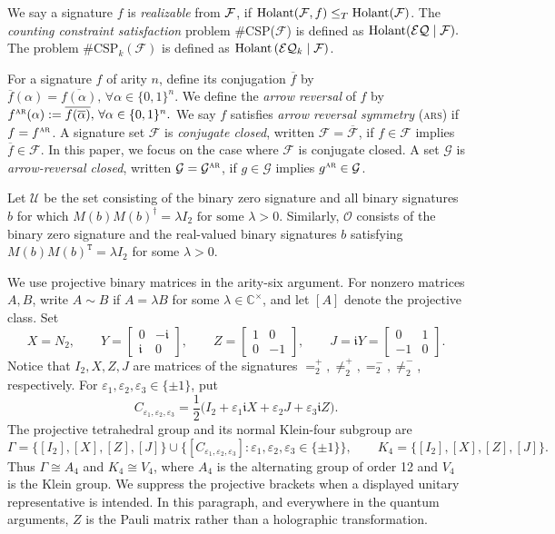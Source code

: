 We say a signature $f$ is \emph{realizable} from $\mathcal{F}$, if $\operatorname{Holant}(\mathcal{F},f)\leq_T \operatorname{Holant}(\mathcal{F})$.
The \emph{counting constraint satisfaction} problem \#CSP($\mathcal{F}$) is defined as $\operatorname{Holant}(\mathcal{EQ}\mid \mathcal{F}).$
The problem \#$\mathrm{CSP}_k(\mathcal{F})$ is defined as $\operatorname{Holant}\left(\mathcal{EQ}_k\mid \mathcal{F}\right)$.

For a signature $f$ of arity $n$, define its conjugation $\overline{f}$ by $\overline{f}(\alpha)=\overline{f(\alpha)},\,\forall\alpha\in \{0,1\}^n$.
We define the \emph{arrow reversal} of $f$ by
\(
f^{\textsc{ar}}(\alpha)
:=\overline{f(\overline\alpha)},\,\forall\alpha\in \{0,1\}^n.
\)
We say $f$ satisfies \emph{arrow reversal symmetry} (\textsc{ars}) if
$f=f^{\textsc{ar}}$.  
A signature set $\mathcal F$ is
\emph{conjugate closed}, written $\mathcal F=\overline{\mathcal F}$, if
$f\in\mathcal F$ implies $\overline f\in\mathcal F$.  
In this paper, we focus on the case where $\mathcal{F}$ is conjugate closed.
A set $\mathcal G$
is \emph{arrow-reversal closed}, written
$\mathcal G=\mathcal G^{\textsc{ar}}$, if $g\in\mathcal G$ implies
$g^{\textsc{ar}}\in\mathcal G$.  


Let $\mathcal U$ be the set consisting of the binary zero signature and
all binary signatures $b$ for which
\(
M(b)M(b)^\dagger=\lambda I_2
\text{ for some }\lambda>0.
\)
Similarly, $\mathcal O$ consists of the binary zero signature and the
real-valued binary signatures $b$ satisfying
$M(b)M(b)^{\mathtt T}=\lambda I_2$ for some $\lambda>0$.  

We use projective binary matrices in the arity-six argument.  For nonzero
matrices $A,B$, write $A\sim B$ if $A=\lambda B$ for some
$\lambda\in\mathbb C^\times$, and let $[A]$ denote the projective class.
Set
\[
X=N_2,\qquad
Y=\begin{bmatrix}0&-\mathfrak i\\ \mathfrak i&0\end{bmatrix},\qquad
Z=\begin{bmatrix}1&0\\0&-1\end{bmatrix},\qquad
J=\mathfrak iY=\begin{bmatrix}0&1\\-1&0\end{bmatrix}.
\]
Notice that $I_2,X,Z,J$ are matrices of the signatures $=_2^{+},\neq_2^{+},=_2^{-},\neq_2^{-}$, respectively.
For $\varepsilon_1,\varepsilon_2,\varepsilon_3\in\{\pm1\}$, put
\[
C_{\varepsilon_1,\varepsilon_2,\varepsilon_3}
=\frac12\bigl(I_2+\varepsilon_1\mathfrak iX
                 +\varepsilon_2J+\varepsilon_3\mathfrak iZ\bigr).
\]
The projective tetrahedral group and its normal Klein-four subgroup are
\[
\Gamma
=\{[I_2],[X],[Z],[J]\}
 \cup
 \{[C_{\varepsilon_1,\varepsilon_2,\varepsilon_3}]:
        \varepsilon_1,\varepsilon_2,\varepsilon_3\in\{\pm1\}\},
\qquad
K_4=\{[I_2],[X],[Z],[J]\}.
\]
Thus $\Gamma\cong A_4$ and $K_4\cong V_4$, where $A_4$ is the alternating group of order 12 and $V_4$ is the Klein group.
We suppress the projective
brackets when a displayed unitary representative is intended. 
In this paragraph, and everywhere in the quantum arguments, $Z$ is the Pauli
matrix rather than a holographic transformation.
